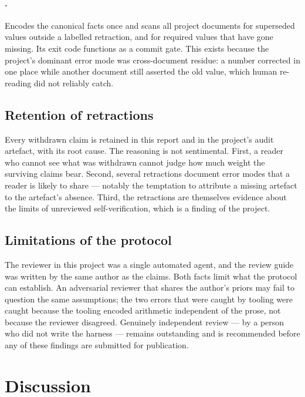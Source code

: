 \documentclass[11pt,a4paper]{article}
\newcommand{\file}[1]{\texttt{\footnotesize\detokenize{#1}}}
\begin{document}
\paragraph{\file{tools/check\_doc\_consistency.py}.} Encodes the canonical facts
once and scans all project documents for superseded values outside a labelled
retraction, and for required values that have gone missing. Its exit code
functions as a commit gate. This exists because the project's dominant error mode
was cross-document residue: a number corrected in one place while another
document still asserted the old value, which human re-reading did not reliably
catch.

\subsection{Retention of retractions}

Every withdrawn claim is retained in this report and in the project's audit
artefact, with its root cause. The reasoning is not sentimental. First, a reader
who cannot see what was withdrawn cannot judge how much weight the surviving
claims bear. Second, several retractions document error modes that a reader is
likely to share --- notably the temptation to attribute a missing artefact to the
artefact's absence. Third, the retractions are themselves evidence about the
limits of unreviewed self-verification, which is a finding of the project.

\subsection{Limitations of the protocol}

The reviewer in this project was a single automated agent, and the review guide
was written by the same author as the claims. Both facts limit what the protocol
can establish. An adversarial reviewer that shares the author's priors may fail to
question the same assumptions; the two errors that were caught by tooling were
caught because the tooling encoded arithmetic independent of the prose, not
because the reviewer disagreed. Genuinely independent review --- by a person who
did not write the harness --- remains outstanding and is recommended before any of
these findings are submitted for publication.

\section{Discussion}
\end{document}
